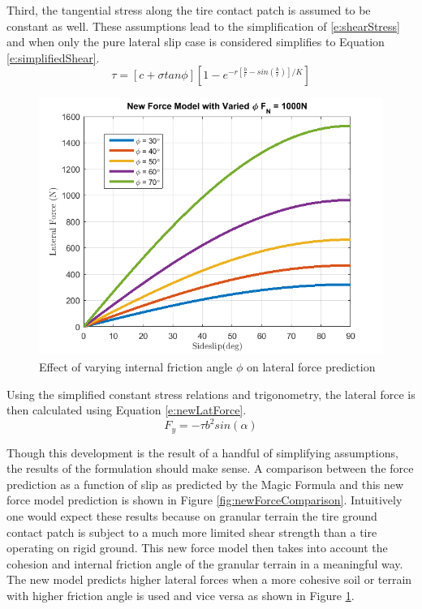 \documentclass[12pt,onecolumn]{report}
\begin{document}
Third, the tangential stress along the tire contact patch is assumed to be constant as well. These assumptions lead to the simplification of \eqref{e:shearStress} and when only the pure lateral slip case is considered simplifies to Equation \eqref{e:simplifiedShear}.
%
\begin{equation}\label{e:simplifiedShear}
\tau = [c+\sigma tan\phi][1 - e^{-r[\frac{b}{r} - sin\left(\frac{b}{r}\right)]/K}]
\end{equation}

\begin{figure}
	\centering
	\includegraphics[width=0.8\columnwidth]{Figs/variedPhi.png}
	\caption{\small Effect of varying internal friction angle $\phi$ on lateral force prediction}  
	\label{fig:variedPhi}
\end{figure}

Using the simplified constant stress relations and trigonometry, the lateral force is then calculated using Equation \eqref{e:newLatForce}. 
%
\begin{equation}\label{e:newLatForce}
F_y = -\tau b^2 sin\left(\alpha\right)
\end{equation}

Though this development is the result of a handful of simplifying assumptions, the results of the formulation should make sense. A comparison between the force prediction as a function of slip as predicted by the Magic Formula and this new force model prediction is shown in Figure \ref{fig:newForceComparison}. Intuitively one would expect these results because on granular terrain the tire ground contact patch is subject to a much more limited shear strength than a tire operating on rigid ground. This new force model then takes into account the cohesion and internal friction angle of the granular terrain in a meaningful way. The new model predicts higher lateral forces when a more cohesive soil or terrain with higher friction angle is used and vice versa as shown in Figure \ref{fig:variedPhi}.
\end{document}

